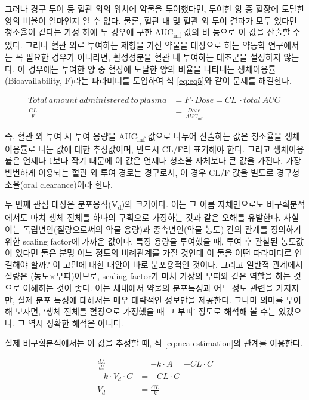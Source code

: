 \documentclass[
  11pt,
  krantz2, a4paper, twoside]{krantz}
\theoremstyle{definition}
\theoremstyle{definition}
\theoremstyle{definition}
\theoremstyle{definition}
\theoremstyle{remark}
\begin{document}
그러나 경구 투여 등 혈관 외의 위치에 약물을 투여했다면, 투여한 양 중 혈장에 도달한 양의 비율이 얼마인지 알 수 없다.
물론, 혈관 내 및 혈관 외 투여 결과가 모두 있다면 청소율이 같다는 가정 하에 두 경우에 구한 AUC\textsubscript{inf} 값의 비 등으로 이 값을 산출할 수 있다.
그러나 혈관 외로 투여하는 제형을 가진 약물을 대상으로 하는 약동학 연구에서는 꼭 필요한 경우가 아니라면, 활성성분을 혈관 내 투여하는 대조군을 설정하지 않는다.
이 경우에는 투여한 양 중 혈장에 도달한 양의 비율을 나타내는 생체이용률(Bioavailability, F)라는 파라미터를 도입하여 식 \eqref{eq:eq5}와 같이 문제를 해결한다.

\begin{equation}
\begin{split}
Total\ amount\ administered\ to\ plasma &= F \cdot Dose = CL\  \cdot total\ AUC\ \\
\frac{{CL}}{F} &= \frac{{Dose}}{{AUC}_{\inf}}
\end{split}
\label{eq:eq5}
\end{equation}

즉, 혈관 외 투여 시 투여 용량을 AUC\textsubscript{inf} 값으로 나누어 산출하는 값은 청소율을 생체이용률로 나눈 값에 대한 추정값이며, 반드시 CL/F라 표기해야 한다. 그리고 생체이용률은 언제나 1보다 작기 때문에 이 값은 언제나 청소율 자체보다 큰 값을 가진다. 가장 빈번하게 이용되는 혈관 외 투여 경로는 경구로서, 이 경우 CL/F 값을 별도로 경구청소율(oral clearance)이라 한다.

두 번째 관심 대상은 분포용적(V\textsubscript{d})의 크기이다.
이는 그 이름 자체만으로도 비구획분석에서도 마치 생체 전체를 하나의 구획으로 가정하는 것과 같은 오해를 유발한다.
사실 이는 독립변인(질량으로써의 약물 용량)과 종속변인(약물 농도) 간의 관계를 정의하기 위한 scaling factor에 가까운 값이다.
특정 용량을 투여했을 때, 투여 후 관찰된 농도값이 있다면 둘은 분명 어느 정도의 비례관계를 가질 것인데 이 둘을 어떤 파라미터로 연결해야 할까? 이 고민에 대한 대안이 바로 분포용적인 것이다. 그리고 일반적 관계에서 질량은 (농도×부피)이므로, scaling factor가 마치 가상의 부피와 같은 역할을 하는 것으로 이해하는 것이 좋다. 이는 체내에서 약물의 분포특성과 어느 정도 관련을 가지지만, 실제 분포 특성에 대해서는 매우 대략적인 정보만을 제공한다. 그나마 의미를 부여해 보자면, `생체 전체를 혈장으로 가정했을 때 그 부피' 정도로 해석해 볼 수는 있겠으나, 그 역시 정확한 해석은 아니다.

실제 비구획분석에서는 이 값을 추정할 때, 식 \eqref{eq:nca-estimation}의 관계를 이용한다.

\begin{equation}
\begin{split}
\frac{{dA}}{{dt}} &= - k \cdot A = - CL \cdot C \\
- k \cdot V_{d} \cdot C &= - CL \cdot C \\
V_{d} &= \frac{CL}{k}
\end{split}
\label{eq:nca-estimation}
\end{equation}
\end{document}
